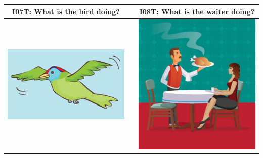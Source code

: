 \documentclass[12pt,notitlepage]{article}
\begin{document}
\begin{center}
\begin{tabular}{|c|c|c|}
\hline
I07T: What is the bird doing? && I08T: What is the waiter doing? \\
\hline
\includegraphics[width=20em,trim=0 0 0 -3]{figures/I07.jpg} & & \includegraphics[width=20em,trim=0 0 0 -3]{figures/I08.jpg} \\
\hline
\end{tabular}
\vspace{1em} \\



\end{center}
\end{document}
